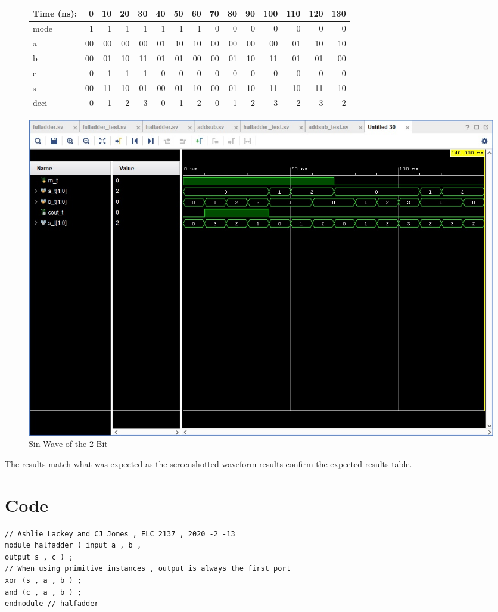 \documentclass[11pt]{article}
\begin{document}
\begin{figure}[ht]\centering
		\begin{tabular}{l|rrrrrrrrrrrrrr}
			Time (ns): & 0 & 10 & 20 & 30 & 40 & 50 & 60 & 70 & 80 & 90 & 100 & 110 & 120 & 130 \\
			\midrule 
			mode & 1 & 1 & 1 & 1 & 1 & 1 & 1 & 0 & 0 & 0 & 0 & 0 & 0 & 0 \\ 
			a & 00 & 00 & 00 & 00 & 01 & 10 & 10 & 00 & 00 & 00 & 00 & 01 & 10 & 10 \\
			b & 00 & 01 & 10 & 11 & 01 & 01 & 00 & 00 & 01 & 10 & 11 & 01 & 01 & 00\\
			\midrule
			c & 0 & 1 & 1 & 1 & 0 & 0 & 0 & 0 & 0 & 0 & 0 & 0 & 0 & 0 \\
			s & 00 & 11 & 10 & 01 & 00 & 01 & 10 & 00 & 01 & 10 & 11 & 10 & 11 & 10 \\
			deci & 0 & -1 & -2 & -3 & 0 & 1 & 2 & 0 & 1 & 2 & 3 & 2 & 3 & 2 \\
			\bottomrule
		\end{tabular}\medskip
		
	

\end{figure}
\begin{figure}
	\includegraphics[width=1.0\textwidth]{"AddSubReal"}
	\caption{Sin Wave of the 2-Bit }
\end{figure}
\clearpage

The results match what was expected as the screenshotted waveform results confirm the expected results table. 
\section*{Code}
\begin{lstlisting}[style=Verilog,caption=Half Adder Design Code,label=code:ex ]
// Ashlie Lackey and CJ Jones , ELC 2137 , 2020 -2 -13
module halfadder ( input a , b ,
output s , c ) ;
// When using primitive instances , output is always the first port
xor (s , a , b ) ;
and (c , a , b ) ;
endmodule // halfadder

\end{lstlisting}
\end{document}
